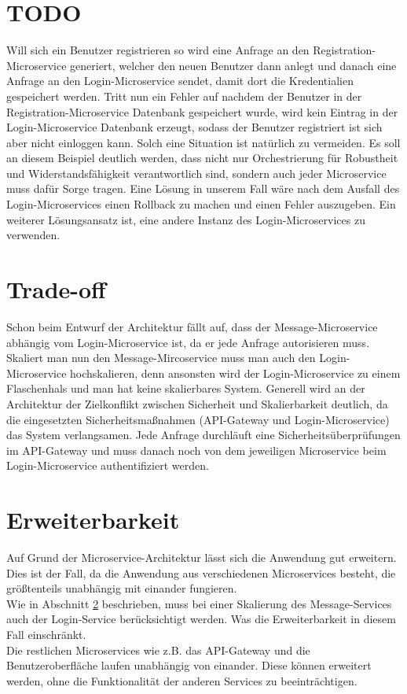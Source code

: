  \section{TODO}
 Will sich ein Benutzer registrieren so wird eine Anfrage an den Registration-Microservice generiert, welcher den neuen Benutzer dann anlegt und danach eine Anfrage an den Login-Microservice sendet, damit dort die Kredentialien gespeichert werden. Tritt nun ein Fehler auf nachdem der Benutzer in der Registration-Microservice Datenbank gespeichert wurde, wird kein Eintrag in der Login-Microservice Datenbank erzeugt, sodass der Benutzer registriert ist sich aber nicht einloggen kann. Solch eine Situation ist natürlich zu vermeiden. Es soll an diesem Beispiel deutlich werden, dass nicht nur Orchestrierung für Robustheit und Widerstandsfähigkeit verantwortlich sind, sondern auch jeder Microservice muss dafür Sorge tragen. Eine Lösung in unserem Fall wäre nach dem Ausfall des Login-Microservices einen Rollback zu machen und einen Fehler auszugeben. Ein weiterer Lösungsansatz ist, eine andere Instanz des Login-Microservices zu verwenden.
 
\section{Trade-off}
\label{tradeoff}
Schon beim Entwurf der Architektur fällt auf, dass der Message-Microservice abhängig vom Login-Microservice ist, da er jede Anfrage autorisieren muss. Skaliert man nun den Message-Mircoservice muss man auch den Login-Microservice hochskalieren, denn ansonsten wird der Login-Microservice zu einem Flaschenhals und man hat keine skalierbares System. Generell wird an der Architektur der Zielkonflikt zwischen Sicherheit und Skalierbarkeit deutlich, da die eingesetzten Sicherheitsmaßnahmen (API-Gateway und Login-Microservice) das System verlangsamen. Jede Anfrage durchläuft eine Sicherheitsüberprüfungen im API-Gateway und muss danach noch von dem jeweiligen Microservice beim Login-Microservice authentifiziert werden.


\section{Erweiterbarkeit}
Auf Grund der Microservice-Architektur lässt sich die Anwendung gut erweitern. Dies ist der Fall, da die Anwendung aus verschiedenen Microservices besteht, die größtenteils unabhängig mit einander fungieren.\\
Wie in Abschnitt \ref{tradeoff} beschrieben, muss bei einer Skalierung des Message-Services auch der Login-Service berücksichtigt werden. Was die Erweiterbarkeit in diesem Fall einschränkt.\\
Die restlichen Microservices wie z.B. das API-Gateway und die Benutzeroberfläche laufen unabhängig von einander. Diese können erweitert werden, ohne die Funktionalität der anderen Services zu beeinträchtigen.